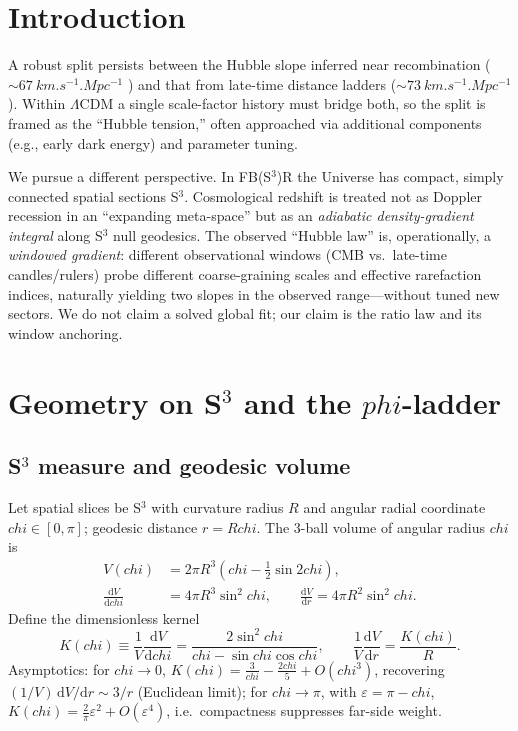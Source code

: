 \documentclass[
  onecolumn,
  amsmath,amssymb,
  aps,
  prd,
  superscriptaddress,
  nofootinbib,
  longbibliography
]{revtex4-2}
\newcommand{\vp}{\varphi}
\def\varphi{phi}%
\def\chi{chi}%
\begin{document}
\maketitle

\section{Introduction}
A robust split persists between the Hubble slope inferred near recombination ($\sim\SI{67}{km.s^{-1}.Mpc^{-1}}$ \cite{Planck2018}) and that from late-time distance ladders ($\sim\SI{73}{km.s^{-1}.Mpc^{-1}}$ \cite{Riess2024,JWSTCepheids}). Within $\Lambda$CDM a single scale-factor history must bridge both, so the split is framed as the ``Hubble tension,'' often approached via additional components (e.g., early dark energy) and parameter tuning.

We pursue a different perspective. In FB(S$^3$)R the Universe has compact, simply connected spatial sections S$^3$. Cosmological redshift is treated not as Doppler recession in an ``expanding meta-space'' but as an \emph{adiabatic density-gradient integral} along S$^3$ null geodesics. The observed ``Hubble law'' is, operationally, a \emph{windowed gradient}: different observational windows (CMB vs.\ late-time candles/rulers) probe different coarse-graining scales and effective rarefaction indices, naturally yielding two slopes in the observed range---without tuned new sectors. We do not claim a solved global fit; our claim is the ratio law and its window anchoring.

\section{Geometry on S$^3$ and the $\vp$-ladder}
\subsection{S$^3$ measure and geodesic volume}
Let spatial slices be S$^3$ with curvature radius $R$ and angular radial coordinate $\chi\in[0,\pi]$; geodesic distance $r=R\chi$.
The 3-ball volume of angular radius $\chi$ is
\begin{align}
V(\chi)&=2\pi R^3\!\left(\chi-\tfrac12\sin 2\chi\right),\\
\frac{\mathrm{d} V}{\mathrm{d} \chi}&=4\pi R^3\sin^2\chi,\qquad 
\frac{\mathrm{d} V}{\mathrm{d} r}=4\pi R^2\sin^2\chi.
\end{align}
Define the dimensionless kernel
\begin{equation}
\label{eq:kernel}
K(\chi)\equiv \frac{1}{V}\frac{\mathrm{d} V}{\mathrm{d}\chi}
=\frac{2\sin^2\chi}{\chi-\sin\chi\cos\chi},\qquad
\frac{1}{V}\frac{\mathrm{d} V}{\mathrm{d} r}=\frac{K(\chi)}{R}.
\end{equation}
Asymptotics: for $\chi\to 0$, $K(\chi)=\tfrac{3}{\chi}-\tfrac{2\chi}{5}+O(\chi^3)$, recovering $(1/V)\,\mathrm{d}V/\mathrm{d} r\sim 3/r$ (Euclidean limit); for $\chi\to\pi$, with $\varepsilon=\pi-\chi$, $K(\chi)=\tfrac{2}{\pi}\varepsilon^2+O(\varepsilon^4)$, i.e.\ compactness suppresses far-side weight.
\end{document}
